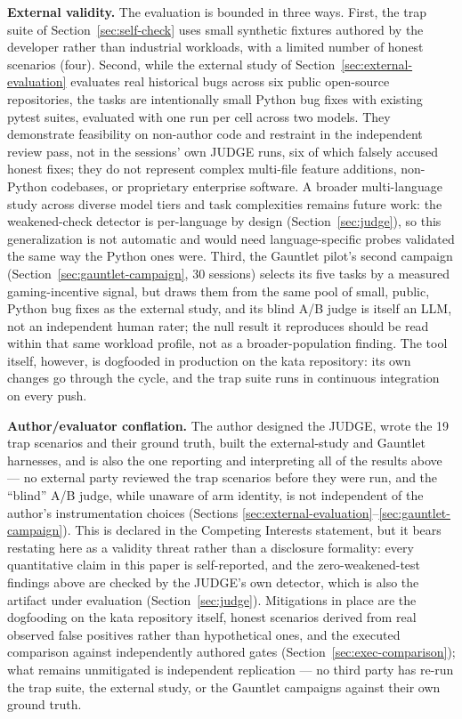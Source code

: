 \documentclass[11pt]{article}
\begin{document}
\textbf{External validity.} The evaluation is bounded in three ways. First,
the trap suite of Section~\ref{sec:self-check} uses small synthetic
fixtures authored by the developer rather than industrial workloads, with a
limited number of honest scenarios (four). Second, while the external study
of Section~\ref{sec:external-evaluation} evaluates real historical bugs
across six public open-source repositories, the tasks are intentionally small
Python bug fixes with existing pytest suites, evaluated with one run per
cell across two models. They demonstrate feasibility on non-author code and
restraint in the independent review pass, not in the sessions' own JUDGE
runs, six of which falsely accused honest fixes; they do not represent complex multi-file feature additions,
non-Python codebases, or proprietary enterprise software. A broader
multi-language study across diverse model tiers and task complexities
remains future work: the weakened-check detector is per-language by design
(Section~\ref{sec:judge}), so this generalization is not automatic and would
need language-specific probes validated the same way the Python ones were.
Third, the Gauntlet pilot's second campaign (Section~\ref{sec:gauntlet-campaign}, 30
sessions) selects its five tasks by a measured gaming-incentive signal, but
draws them from the same pool of small, public, Python bug fixes as the
external study, and its blind A/B judge is itself an LLM, not an independent
human rater; the null result it reproduces should be read within that same
workload profile, not as a broader-population finding. The tool itself, however, is dogfooded in production on
the kata repository: its own changes go through the cycle, and the trap
suite runs in continuous integration on every push.

\textbf{Author/evaluator conflation.} The author designed the JUDGE, wrote
the 19 trap scenarios and their ground truth, built the external-study and
Gauntlet harnesses, and is also the one reporting and interpreting all of
the results above --- no external party reviewed the trap scenarios before
they were run, and the ``blind'' A/B judge, while unaware of arm identity,
is not independent of the author's instrumentation choices (Sections
\ref{sec:external-evaluation}--\ref{sec:gauntlet-campaign}). This is
declared in the Competing Interests statement, but it bears restating here
as a validity threat rather than a disclosure formality: every quantitative
claim in this paper is self-reported, and the zero-weakened-test findings
above are checked by the JUDGE's own detector, which is also the artifact
under evaluation (Section~\ref{sec:judge}). Mitigations in place are the
dogfooding on the kata repository itself, honest scenarios derived from real
observed false positives rather than hypothetical ones, and the executed
comparison against independently authored gates (Section~\ref{sec:exec-comparison});
what remains unmitigated is independent replication --- no third party has
re-run the trap suite, the external study, or the Gauntlet campaigns against
their own ground truth.
\end{document}
